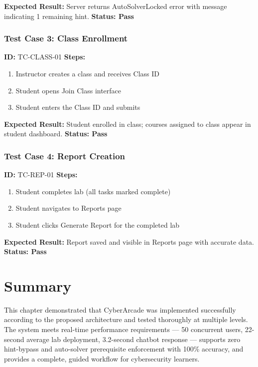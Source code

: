 \documentclass[12pt,a4paper]{report}
\begin{document}
\textbf{Expected Result:} Server returns AutoSolverLocked error with message indicating 1 remaining hint.
\textbf{Status: Pass}

\subsubsection{Test Case 3: Class Enrollment}

\textbf{ID:} TC-CLASS-01 \quad \textbf{Steps:}
\begin{enumerate}
  \item Instructor creates a class and receives Class ID
  \item Student opens Join Class interface
  \item Student enters the Class ID and submits
\end{enumerate}

\textbf{Expected Result:} Student enrolled in class; courses assigned to class appear in student dashboard.
\textbf{Status: Pass}

\subsubsection{Test Case 4: Report Creation}

\textbf{ID:} TC-REP-01 \quad \textbf{Steps:}
\begin{enumerate}
  \item Student completes lab (all tasks marked complete)
  \item Student navigates to Reports page
  \item Student clicks Generate Report for the completed lab
\end{enumerate}

\textbf{Expected Result:} Report saved and visible in Reports page with accurate data.
\textbf{Status: Pass}

\section{Summary}

This chapter demonstrated that CyberArcade was implemented successfully according to the proposed
architecture and tested thoroughly at multiple levels. The system meets real-time performance
requirements --- 50 concurrent users, 22-second average lab deployment, 3.2-second chatbot response
--- supports zero hint-bypass and auto-solver prerequisite enforcement with 100\% accuracy, and
provides a complete, guided workflow for cybersecurity learners.
\end{document}
